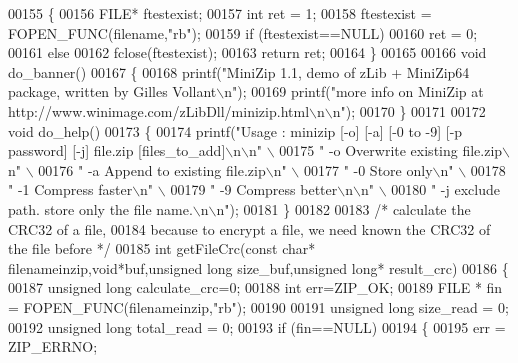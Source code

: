 \begin{DoxyCode}
00155 \{
00156     FILE* ftestexist;
00157     \textcolor{keywordtype}{int} ret = 1;
00158     ftestexist = FOPEN\_FUNC(filename,\textcolor{stringliteral}{"rb"});
00159     \textcolor{keywordflow}{if} (ftestexist==NULL)
00160         ret = 0;
00161     \textcolor{keywordflow}{else}
00162         fclose(ftestexist);
00163     \textcolor{keywordflow}{return} ret;
00164 \}
00165 
00166 \textcolor{keywordtype}{void} do\_banner()
00167 \{
00168     printf(\textcolor{stringliteral}{"MiniZip 1.1, demo of zLib + MiniZip64 package, written by Gilles Vollant\(\backslash\)n"});
00169     printf(\textcolor{stringliteral}{"more info on MiniZip at http://www.winimage.com/zLibDll/minizip.html\(\backslash\)n\(\backslash\)n"});
00170 \}
00171 
00172 \textcolor{keywordtype}{void} do\_help()
00173 \{
00174     printf(\textcolor{stringliteral}{"Usage : minizip [-o] [-a] [-0 to -9] [-p password] [-j] file.zip [files\_to\_add]\(\backslash\)n\(\backslash\)n"} \(\backslash\)
00175            \textcolor{stringliteral}{"  -o  Overwrite existing file.zip\(\backslash\)n"} \(\backslash\)
00176            \textcolor{stringliteral}{"  -a  Append to existing file.zip\(\backslash\)n"} \(\backslash\)
00177            \textcolor{stringliteral}{"  -0  Store only\(\backslash\)n"} \(\backslash\)
00178            \textcolor{stringliteral}{"  -1  Compress faster\(\backslash\)n"} \(\backslash\)
00179            \textcolor{stringliteral}{"  -9  Compress better\(\backslash\)n\(\backslash\)n"} \(\backslash\)
00180            \textcolor{stringliteral}{"  -j  exclude path. store only the file name.\(\backslash\)n\(\backslash\)n"});
00181 \}
00182 
00183 \textcolor{comment}{/* calculate the CRC32 of a file,}
00184 \textcolor{comment}{   because to encrypt a file, we need known the CRC32 of the file before */}
00185 \textcolor{keywordtype}{int} getFileCrc(\textcolor{keyword}{const} \textcolor{keywordtype}{char}* filenameinzip,\textcolor{keywordtype}{void}*buf,\textcolor{keywordtype}{unsigned} \textcolor{keywordtype}{long} size\_buf,\textcolor{keywordtype}{unsigned} \textcolor{keywordtype}{long}* result\_crc)
00186 \{
00187    \textcolor{keywordtype}{unsigned} \textcolor{keywordtype}{long} calculate\_crc=0;
00188    \textcolor{keywordtype}{int} err=ZIP\_OK;
00189    FILE * fin = FOPEN\_FUNC(filenameinzip,\textcolor{stringliteral}{"rb"});
00190 
00191    \textcolor{keywordtype}{unsigned} \textcolor{keywordtype}{long} size\_read = 0;
00192    \textcolor{keywordtype}{unsigned} \textcolor{keywordtype}{long} total\_read = 0;
00193    \textcolor{keywordflow}{if} (fin==NULL)
00194    \{
00195        err = ZIP\_ERRNO;

\end{DoxyCode}
